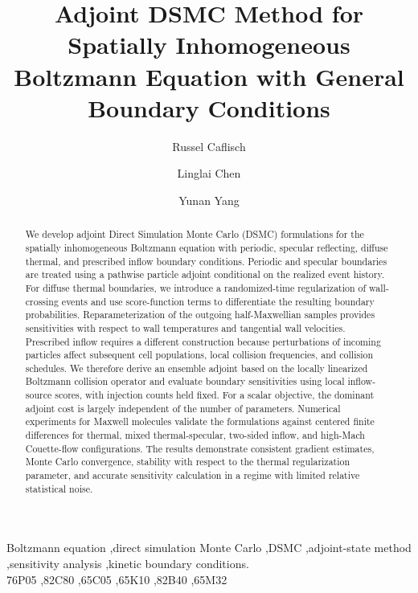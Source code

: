 \documentclass[12pt,nopreprintline]{elsarticle}
\begin{document}
\begin{frontmatter}
\title{Adjoint DSMC Method for Spatially Inhomogeneous Boltzmann Equation with General Boundary Conditions}


\author[address1]{Russel  Caflisch}
\address[address1]{Courant Institute of Mathematical Sciences, New York University, New York, NY 10012, USA}
\author[address2]{Linglai Chen}
\address[address2]{Department of Computer Science, School of Computing, National University of Singapore, Singapore 117417, Singapore}
\author[address3]{Yunan Yang}
\address[address3]{Department of Mathematics, Cornell University, Ithaca, NY 14853, USA}

\begin{abstract}
We develop adjoint Direct Simulation Monte Carlo (DSMC) formulations for the spatially inhomogeneous Boltzmann equation with periodic, specular reflecting, diffuse thermal, and prescribed inflow boundary conditions. Periodic and specular boundaries are treated using a pathwise particle adjoint conditional on the realized event history. For diffuse thermal boundaries, we introduce a randomized-time regularization of wall-crossing events and use score-function terms to differentiate the resulting boundary probabilities. Reparameterization of the outgoing half-Maxwellian samples provides sensitivities with respect to wall temperatures and tangential wall velocities. Prescribed inflow requires a different construction because perturbations of incoming particles affect subsequent cell populations, local collision frequencies, and collision schedules. We therefore derive an ensemble adjoint based on the locally linearized Boltzmann collision operator and evaluate boundary sensitivities using local inflow-source scores, with injection counts held fixed. For a scalar objective, the dominant adjoint cost is largely independent of the number of parameters. Numerical experiments for Maxwell molecules validate the formulations against centered finite differences for thermal, mixed thermal-specular, two-sided inflow, and high-Mach Couette-flow configurations. The results demonstrate consistent gradient estimates, Monte Carlo convergence, stability with respect to the thermal regularization parameter, and accurate sensitivity calculation in a regime with limited relative statistical noise.
\end{abstract}

\begin{keyword}
Boltzmann equation \sep direct simulation Monte Carlo \sep DSMC
\sep adjoint-state method \sep sensitivity analysis
\sep kinetic boundary conditions.\\

\MSC 76P05 \sep  82C80 \sep 65C05 \sep  65K10 \sep 82B40 \sep 65M32
\end{keyword}


\end{frontmatter}
\end{document}
